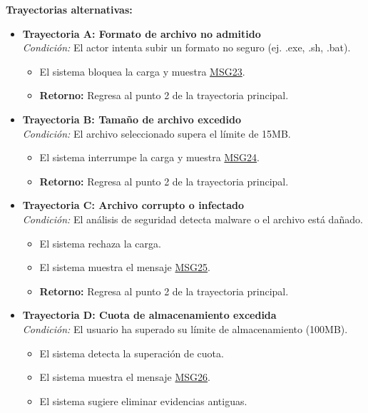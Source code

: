 \begin{appendices}
\textbf{Trayectorias alternativas:}
\begin{itemize}[leftmargin=*]
    \item \textbf{Trayectoria A: Formato de archivo no admitido} \\
    \textit{Condición:} El actor intenta subir un formato no seguro (ej. .exe, .sh, .bat).
    \begin{itemize}[nosep]
        \item[A-1:] El sistema bloquea la carga y muestra \hyperlink{msg:MSG23}{MSG23}.
        \item \textbf{Retorno:} Regresa al punto 2 de la trayectoria principal.
    \end{itemize}
    \item \textbf{Trayectoria B: Tamaño de archivo excedido} \\
    \textit{Condición:} El archivo seleccionado supera el límite de 15MB.
    \begin{itemize}[nosep]
        \item[B-1:] El sistema interrumpe la carga y muestra \hyperlink{msg:MSG24}{MSG24}.
        \item \textbf{Retorno:} Regresa al punto 2 de la trayectoria principal.
    \end{itemize}
    \item \textbf{Trayectoria C: Archivo corrupto o infectado} \\
    \textit{Condición:} El análisis de seguridad detecta malware o el archivo está dañado.
    \begin{itemize}[nosep]
        \item[C-1:] El sistema rechaza la carga.
        \item[C-2:] El sistema muestra el mensaje \hyperlink{msg:MSG25}{MSG25}.
        \item \textbf{Retorno:} Regresa al punto 2 de la trayectoria principal.
    \end{itemize}
    \item \textbf{Trayectoria D: Cuota de almacenamiento excedida} \\
    \textit{Condición:} El usuario ha superado su límite de almacenamiento (100MB).
    \begin{itemize}[nosep]
        \item[D-1:] El sistema detecta la superación de cuota.
        \item[D-2:] El sistema muestra el mensaje \hyperlink{msg:MSG26}{MSG26}.
        \item[D-3:] El sistema sugiere eliminar evidencias antiguas.

\end{itemize}
\end{itemize}
\end{appendices}
